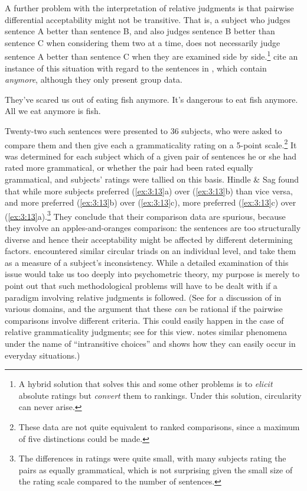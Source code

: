 A further problem with the interpretation of relative judgments is that pairwise differential acceptability might not be transitive. That is, a subject who judges sentence A better than sentence B, and also judges sentence B better than sentence C when considering them two at a time, does not necessarily judge sentence A better than sentence C when they are examined side by side.\footnote{A hybrid solution that solves this and some other problems is to \textit{elicit} absolute ratings but
\textit{convert} them to rankings. Under this solution, circularity can never arise.}
\citet{HindleEtAl1975} cite an instance of this situation with regard to the sentences in , which contain \textit{anymore}, although they only present group data.

\ea \label{ex:3:13}
\ea They've scared us out of eating fish anymore. 
\ex It's dangerous to eat fish anymore.
\ex All we eat anymore is fish.
\z
\z

\noindent
Twenty-two such sentences were presented to 36 subjects, who were asked to compare them and then give each a grammaticality rating on a 5-point scale.\footnote{These data are not quite equivalent to ranked comparisons, since a maximum of five distinctions could be made.}
 It was determined for each subject which of a given pair of sentences he or she had rated more grammatical, or whether the pair had been rated equally grammatical, and subjects' ratings were tallied on this basis. Hindle \& Sag found that while more subjects preferred (\ref{ex:3:13}a) over (\ref{ex:3:13}b) than vice versa, and more preferred
(\ref{ex:3:13}b) over (\ref{ex:3:13}c), more preferred (\ref{ex:3:13}c) over (\ref{ex:3:13}a).\footnote{The differences in ratings were quite small, with many subjects rating the pairs as equally grammatical, which is not surprising given the small size of the rating scale compared to the number of sentences.}
 They conclude that their comparison data are spurious, because they involve an apples-and-oranges comparison: the sentences are too structurally diverse and hence their acceptability might be affected by different determining factors. \citet{DanksEtAl1970} encountered similar circular triads on an individual level, and take them as a measure of a subject's inconsistency. While a detailed examination of this issue would take us too deeply into psychometric theory, my purpose is merely to point out that such methodological problems will have to be dealt with if a paradigm involving relative judgments is followed. (See \citet{Gardner1974} for a discussion of  in various domains, and the argument that these \textit{can} be rational if the pairwise comparisons involve different criteria. This could easily happen in the case of relative grammaticality judgments; see \citet{Watt1975} for this view. \citet{Einhorn1982} notes similar phenomena under the name of ``intransitive choices'' and shows how they can easily occur in everyday situations.)

